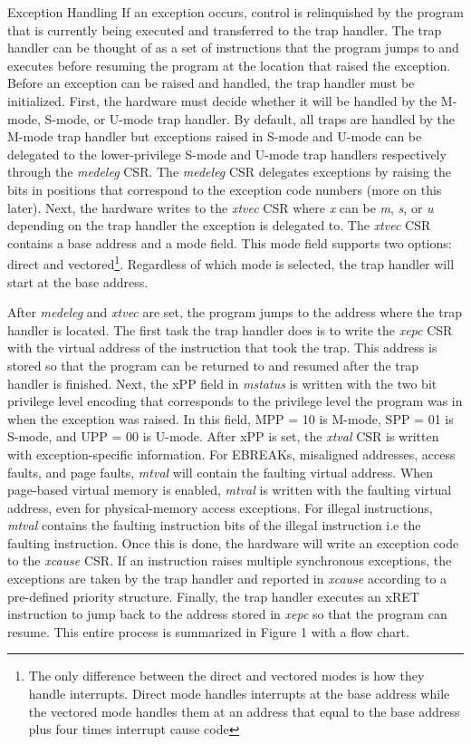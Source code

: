 \documentclass[12pt]{article}
\begin{document}
\begin{section}{Exception Handling}
If an exception occurs, control is relinquished by the program that is currently being executed and transferred to the trap handler. The trap handler can be thought of as a set of instructions that the program jumps to and executes before resuming the program at the location that raised the exception. Before an exception can be raised and handled, the trap handler must be initialized. First, the hardware must decide whether it will be handled by the M-mode, S-mode, or U-mode trap handler. By default, all traps are handled by the M-mode trap handler but exceptions raised in S-mode and U-mode can be delegated to the lower-privilege S-mode and U-mode trap handlers respectively through the \emph{medeleg} CSR. The \emph{medeleg} CSR delegates exceptions by raising the bits in positions that correspond to the exception code numbers (more on this later). Next, the hardware writes to the \emph{xtvec} CSR where \emph{x} can be \emph{m}, \emph{s}, or \emph{u} depending on the trap handler the exception is delegated to. The \emph{xtvec} CSR contains a base address and a mode field. This mode field supports two options: direct and vectored\footnote[1]{The only difference between the direct and vectored modes is how they handle interrupts. Direct mode handles interrupts at the base address while the vectored mode handles them at an address that equal to the base address plus four times interrupt cause code}. Regardless of which mode is selected, the trap handler will start at the base address. 

After \emph{medeleg} and \emph{xtvec} are set, the program jumps to the address where the trap handler is located. The first task the trap handler does is to write the \emph{xepc} CSR with the virtual address of the instruction that took the trap. This address is stored so that the program can be returned to and resumed after the trap handler is finished. Next, the xPP field in \emph{mstatus} is written with the two bit privilege level encoding that corresponds to the privilege level the program was in when the exception was raised. In this field, MPP = 10 is M-mode, SPP = 01 is S-mode, and UPP = 00 is U-mode. After xPP is set, the \emph{xtval} CSR is written with exception-specific information. For EBREAKs, misaligned addresses, access faults, and page faults, \emph{mtval} will contain the faulting virtual address. When page-based virtual memory is enabled, \emph{mtval} is written with the faulting virtual address, even for physical-memory access exceptions. For illegal instructions, \emph{mtval} contains the faulting instruction bits of the illegal instruction i.e the faulting instruction. Once this is done, the hardware will write an exception code to the \emph{xcause} CSR. If an instruction raises multiple synchronous exceptions, the exceptions are taken by the trap handler and reported in \emph{xcause} according to a pre-defined priority structure. Finally, the trap handler executes an xRET instruction to jump back to the address stored in \emph{xepc} so that the program can resume. This entire process is summarized in Figure 1 with a flow chart.   
\end{section}
\end{document}
